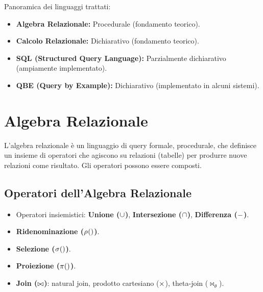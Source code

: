 	Panoramica dei linguaggi trattati:
	\begin{itemize}
		\item \textbf{Algebra Relazionale:} Procedurale (fondamento teorico).
		\item \textbf{Calcolo Relazionale:} Dichiarativo (fondamento teorico).
		\item \textbf{SQL (Structured Query Language):} Parzialmente dichiarativo (ampiamente implementato).
		\item \textbf{QBE (Query by Example):} Dichiarativo (implementato in alcuni sistemi).
	\end{itemize}
	
	\section{Algebra Relazionale}
	
	L'algebra relazionale è un linguaggio di query formale, procedurale, che definisce un insieme di operatori che agiscono su relazioni (tabelle) per produrre nuove relazioni come risultato. Gli operatori possono essere composti.
	
	\subsection{Operatori dell'Algebra Relazionale}
	\begin{itemize}
		\item Operatori insiemistici: \textbf{Unione ($\cup$)}, \textbf{Intersezione ($\cap$)}, \textbf{Differenza ($-$)}.
		\item \textbf{Ridenominazione ($\myrename{}$)}.
		\item \textbf{Selezione ($\sigma_{}()$)}.
		\item \textbf{Proiezione ($\pi_{}()$)}.
		\item \textbf{Join ($\bowtie$)}: natural join, prodotto cartesiano ($\times$), theta-join ($\bowtie_{\theta}$).
	\end{itemize}
	
